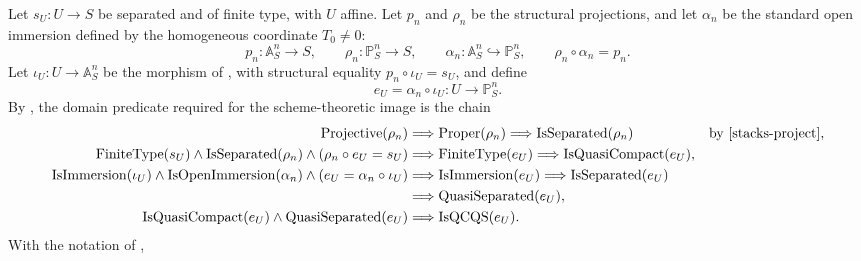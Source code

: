 \begin{definition}
  \label{def:nagata-affine-compactification}

  Let $s_U\colon U\to S$ be separated and of finite type, with $U$ affine.
  Let $p_n$ and $\rho_n$ be the structural projections, and let $\alpha_n$ be
  the standard open immersion defined by the homogeneous coordinate
  $T_0\neq0$:
  \[
    p_n\colon\mathbb A^n_S\to S,
    \qquad
    \rho_n\colon\mathbb P^n_S\to S,
    \qquad
    \alpha_n\colon\mathbb A^n_S\hookrightarrow\mathbb P^n_S,
    \qquad
    \rho_n\circ\alpha_n=p_n.
  \]
  Let $\iota_U\colon U\to\mathbb A^n_S$ be the morphism of
  , with structural
  equality $p_n\circ\iota_U=s_U$, and define
  \[
    e_U=\alpha_n\circ\iota_U\colon U\to\mathbb P^n_S.              \tag{51}
  \]
  By ,
  the domain predicate
  required for the scheme-theoretic image is the chain
  \[
  \begin{aligned}
    \operatorname{Projective}(\rho_n)
      &\Longrightarrow\operatorname{Proper}(\rho_n)
       \Longrightarrow\operatorname{IsSeparated}(\rho_n)
       &&\text{by \cite[Tag 01WC]{stacks-project}},\\
    \operatorname{FiniteType}(s_U)\wedge
      \operatorname{IsSeparated}(\rho_n)\wedge
      (\rho_n\circ e_U=s_U)
      &\Longrightarrow\operatorname{FiniteType}(e_U)
       \Longrightarrow\operatorname{IsQuasiCompact}(e_U),\\
    \operatorname{IsImmersion}(\iota_U)\wedge
      \operatorname{IsOpenImmersion}(\alpha_n)\wedge
      (e_U=\alpha_n\circ\iota_U)
      &\Longrightarrow\operatorname{IsImmersion}(e_U)
       \Longrightarrow\operatorname{IsSeparated}(e_U)\\
      &\Longrightarrow\operatorname{QuasiSeparated}(e_U),\\
    \operatorname{IsQuasiCompact}(e_U)\wedge
      \operatorname{QuasiSeparated}(e_U)
      &\Longrightarrow\operatorname{IsQCQS}(e_U).
  \end{aligned}
  \]
  With the notation of
  ,

\end{definition}
